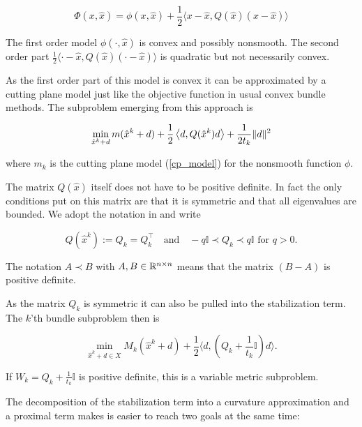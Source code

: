 \begin{equation}
	\Phi(x,\hat{x}) = \phi(x,\hat{x})+\frac{1}{2}\langle x-\hat{x},Q(\hat{x})(x-\hat{x})\rangle
\end{equation}

The first order model \(\phi(\cdot,\hat{x})\) is convex and possibly nonsmooth. The second order part \(\frac{1}{2}\langle \cdot-\hat{x},Q(\hat{x})(\cdot-\hat{x})\rangle\) is quadratic but not necessarily convex.

As the first order part of this model is convex it can be approximated by a cutting plane model just like the objective function in usual convex bundle methods. The subproblem emerging from this approach is

\begin{equation*}
	\min_{\hat{x}^k+d} m(\hat{x}^k+d)+\frac{1}{2}\left\langle d,Q(\hat{x}^k)d \right\rangle + \frac{1}{2t_k}\|d\|^2
\label{sub_prob_Noll}
\end{equation*} 

where \(m_k\) is the cutting plane model (\ref{cp_model}) for the nonsmooth function \(\phi\).

The matrix \(Q(\hat{x})\) itself does not have to be positive definite. In fact the only conditions put on this matrix are that it is symmetric and that all eigenvalues are bounded.
We adopt the notation in \cite{Noll2013} and write

\begin{equation*}
		Q(\hat{x}^k):=Q_k = Q_k^{\top} \quad \text{and} \quad -q\mathbb{I} \prec Q_k \prec q\mathbb{I} \text{ for } q > 0.
\end{equation*}

The notation \( A \prec B\) with \(A, B \in \mathbb{R}^{n\times n}\) means that the matrix \((B-A)\) is positive definite.

As the matrix \(Q_k\) is symmetric it can also be pulled into the stabilization term. The \(k\)'th bundle subproblem then is

\begin{equation}
	\min_{\hat{x}^k+d \in X} M_k(\hat{x}^k+d) + \frac{1}{2}\langle d,\left(Q_k+\frac{1}{t_k}\mathbb{I} \right) d \rangle.
	\label{Q_subprob}
\end{equation}

If \(W_k = Q_k+\frac{1}{t_k}\mathbb{I}\) is positive definite, this is a variable metric subproblem.

The decomposition of the stabilization term into a curvature approximation and a proximal term makes is easier to reach two goals at the same time:


